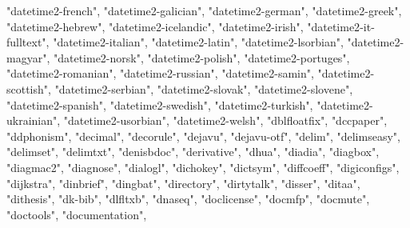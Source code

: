 \documentclass[
]{article}
\newenvironment{Shaded}{\begin{snugshade}}{\end{snugshade}}
\newcommand{\NormalTok}[1]{#1}
\newcommand{\StringTok}[1]{\textcolor[rgb]{0.31,0.60,0.02}{#1}}
\begin{document}
\begin{Shaded}
\begin{Highlighting}[]
\StringTok{"datetime2{-}french"}\NormalTok{, }\StringTok{"datetime2{-}galician"}\NormalTok{, }\StringTok{"datetime2{-}german"}\NormalTok{, }
\StringTok{"datetime2{-}greek"}\NormalTok{, }\StringTok{"datetime2{-}hebrew"}\NormalTok{, }\StringTok{"datetime2{-}icelandic"}\NormalTok{, }
\StringTok{"datetime2{-}irish"}\NormalTok{, }\StringTok{"datetime2{-}it{-}fulltext"}\NormalTok{, }\StringTok{"datetime2{-}italian"}\NormalTok{, }
\StringTok{"datetime2{-}latin"}\NormalTok{, }\StringTok{"datetime2{-}lsorbian"}\NormalTok{, }\StringTok{"datetime2{-}magyar"}\NormalTok{, }
\StringTok{"datetime2{-}norsk"}\NormalTok{, }\StringTok{"datetime2{-}polish"}\NormalTok{, }\StringTok{"datetime2{-}portuges"}\NormalTok{, }
\StringTok{"datetime2{-}romanian"}\NormalTok{, }\StringTok{"datetime2{-}russian"}\NormalTok{, }\StringTok{"datetime2{-}samin"}\NormalTok{, }
\StringTok{"datetime2{-}scottish"}\NormalTok{, }\StringTok{"datetime2{-}serbian"}\NormalTok{, }\StringTok{"datetime2{-}slovak"}\NormalTok{, }
\StringTok{"datetime2{-}slovene"}\NormalTok{, }\StringTok{"datetime2{-}spanish"}\NormalTok{, }\StringTok{"datetime2{-}swedish"}\NormalTok{, }
\StringTok{"datetime2{-}turkish"}\NormalTok{, }\StringTok{"datetime2{-}ukrainian"}\NormalTok{, }\StringTok{"datetime2{-}usorbian"}\NormalTok{, }
\StringTok{"datetime2{-}welsh"}\NormalTok{, }\StringTok{"dblfloatfix"}\NormalTok{, }\StringTok{"dccpaper"}\NormalTok{, }\StringTok{"ddphonism"}\NormalTok{, }\StringTok{"decimal"}\NormalTok{, }
\StringTok{"decorule"}\NormalTok{, }\StringTok{"dejavu"}\NormalTok{, }\StringTok{"dejavu{-}otf"}\NormalTok{, }\StringTok{"delim"}\NormalTok{, }\StringTok{"delimseasy"}\NormalTok{, }\StringTok{"delimset"}\NormalTok{, }
\StringTok{"delimtxt"}\NormalTok{, }\StringTok{"denisbdoc"}\NormalTok{, }\StringTok{"derivative"}\NormalTok{, }\StringTok{"dhua"}\NormalTok{, }\StringTok{"diadia"}\NormalTok{, }\StringTok{"diagbox"}\NormalTok{, }
\StringTok{"diagmac2"}\NormalTok{, }\StringTok{"diagnose"}\NormalTok{, }\StringTok{"dialogl"}\NormalTok{, }\StringTok{"dichokey"}\NormalTok{, }\StringTok{"dictsym"}\NormalTok{, }\StringTok{"diffcoeff"}\NormalTok{, }
\StringTok{"digiconfigs"}\NormalTok{, }\StringTok{"dijkstra"}\NormalTok{, }\StringTok{"dinbrief"}\NormalTok{, }\StringTok{"dingbat"}\NormalTok{, }\StringTok{"directory"}\NormalTok{, }
\StringTok{"dirtytalk"}\NormalTok{, }\StringTok{"disser"}\NormalTok{, }\StringTok{"ditaa"}\NormalTok{, }\StringTok{"dithesis"}\NormalTok{, }\StringTok{"dk{-}bib"}\NormalTok{, }\StringTok{"dlfltxb"}\NormalTok{, }
\StringTok{"dnaseq"}\NormalTok{, }\StringTok{"doclicense"}\NormalTok{, }\StringTok{"docmfp"}\NormalTok{, }\StringTok{"docmute"}\NormalTok{, }\StringTok{"doctools"}\NormalTok{, }\StringTok{"documentation"}\NormalTok{, }

\end{Highlighting}
\end{Shaded}
\end{document}
